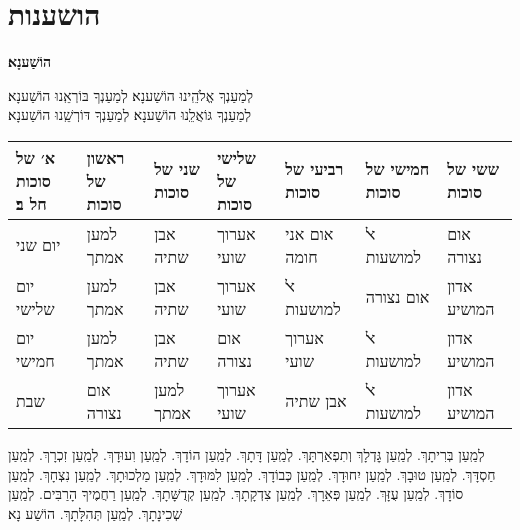 \documentclass[twoside, openany, parskip=half, 11pt]{book}
\begin{document}
\section[הושענות]{ הושענות }
\label{hoshanos}


\begin{Large}
	\textbf{
		הוֹשַׁענָא׃
	}
\end{Large}


לְמַעַנְךָ אֱלֹהֵֽינוּ הוֹשַׁענָא׃ לְמַעַנְךָ בּוֹרְאֵֽנוּ הוֹשַׁענָא׃\\
לְמַעַנְךָ גּוֹאֲלֵֽנוּ הוֹשַׁענָא׃ לְמַעַנְךָ דּוֹרְשֵֽׁנוּ הוֹשַׁענָא׃

\begin{tiny}
	\begin{tabular}{>{\centering\arraybackslash}m{}||>{\centering\arraybackslash}m{}|>{\centering\arraybackslash}m{}|>{\centering\arraybackslash}m{}|>{\centering\arraybackslash}m{}|>{\centering\arraybackslash}m{}|>{\centering\arraybackslash}m{}}
		א׳ של סוכות חל ב׃ & ראשון של סוכות & שני של סוכות & שלישי של סוכות & רביעי של סוכות & חמישי של סוכות & ששי של סוכות \\
		\hline \hline
		יום שני & למען אמתך & אבן שתיה & אערוך שועי & אום אני חומה & ﭏ למושעות & אום נצורה\\ \hline
		יום שלישי & למען אמתך & אבן שתיה & אערוך שועי & ﭏ למושעות & אום נצורה & אדון המושיע \\ \hline
		יום חמישי & למען אמתך & אבן שתיה & אום נצורה & אערוך שועי & ﭏ למושעות & אדון המושיע\\ \hline
		שבת & אום נצורה & למען אמתך & אערוך שועי & אבן שתיה & ﭏ למושעות & אדון המושיע
	\end{tabular}
	
\end{tiny}

לְמַֽעַן בְּרִיתָךְ. לְמַֽעַן גׇּדְלָךְ וְתִפְאַרְתָּךְ. לְמַֽעַן דָּתָךְ. לְמַֽעַן הוֹדָךְ. לְמַֽעַן וִעוּדָךְ. לְמַֽעַן זִכְרָךְ. לְמַֽעַן חַסְדָּךְ. לְמַֽעַן טוּבָךְ. לְמַֽעַן יִחוּדָךְ. לְמַֽעַן כְּבוֹדָךְ. לְמַֽעַן לִמּוּדָךְ. לְמַֽעַן מַלְכוּתָךְ. לְמַֽעַן נִצְחָךְ. לְמַֽעַן סוֹדָךְ. לְמַֽעַן עֻזָּךְ. לְמַֽעַן פְּאֵרָךְ. לְמַֽעַן צִדְקָתָךְ. לְמַֽעַן קְדֻשָּׁתָךְ. לְמַֽעַן רַחֲמֶיךָ הָרַבִּים. לְמַֽעַן שְׁכִינָתָךְ. לְמַֽעַן תְּהִלָּתָךְ. הוֹשַׁע נָא׃

\newcommand{\hoshanaraba}[1]{
	\instruction{בהושענא רבה אומרים׃}
	#1\\
	\instruction{
		בשאר ימי סוכות ממשיכים עם אני והו בעמ׳ \pageref{anivho}}
}
\end{document}

